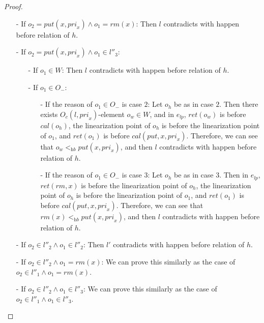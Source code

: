 \begin {proof}
\begin{itemize}
\item[-] If $o_2 = \textit{put}(x,\textit{pri}_x) \wedge o_1 = \textit{rm}(x)$: Then $l$ contradicts with happen before relation of $h$.

\item[-] If $o_2 = \textit{put}(x,\textit{pri}_x) \wedge o_1 \in l''_3$:
    \begin{itemize}
    \setlength{\itemsep}{0.5pt}
    \item[-] If $o_1 \in W$: Then $l$ contradicts with happen before relation of $h$.

    \item[-] If $o_1 \in O_-$:
         \begin{itemize}
         \setlength{\itemsep}{0.5pt}
         \item[-] If the reason of $o_1 \in O_-$ is case $2$: Let $o_h$ be as in case $2$. Then there exists $O_c(l,\textit{pri}_x)$-element $o_w \in W$, and in $e_{\textit{lp}}$, $\textit{ret}(o_w)$ is before $\textit{cal}(o_h)$, the linearization point of $o_h$ is before the linearization point of $o_1$, and $\textit{ret}(o_1)$ is before $\textit{cal}(\textit{put},x,\textit{pri}_x)$. Therefore, we can see that $o_w <_{\textit{hb}} \textit{put}(x,\textit{pri}_x)$, and then $l$ contradicts with happen before relation of $h$.

         \item[-] If the reason of $o_1 \in O_-$ is case $3$: Let $o_h$ be as in case $3$. Then in $e_{\textit{lp}}$, $\textit{ret}(\textit{rm},x)$ is before the linearization point of $o_h$, the linearization point of $o_h$ is before the linearization point of $o_1$, and $\textit{ret}(o_1)$ is before $\textit{cal}(\textit{put},x,\textit{pri}_x)$. Therefore, we can see that $\textit{rm}(x) <_{\textit{hb}} \textit{put}(x,\textit{pri}_x)$, and then $l$ contradicts with happen before relation of $h$.
         \end{itemize}
    \end{itemize}

\item[-] If $o_2 \in l''_2 \wedge o_1 \in l''_2$: Then $l'$ contradicts with happen before relation of $h$.

\item[-] If $o_2 \in l''_2 \wedge o_1 = \textit{rm}(x)$: We can prove this similarly as the case of $o_2 \in l''_1 \wedge o_1 = \textit{rm}(x)$.

\item[-] If $o_2 \in l''_2 \wedge o_1 \in l''_3$: We can prove this similarly as the case of $o_2 \in l''_1 \wedge o_1 \in l''_3$.


\end{itemize}
\end{proof}
